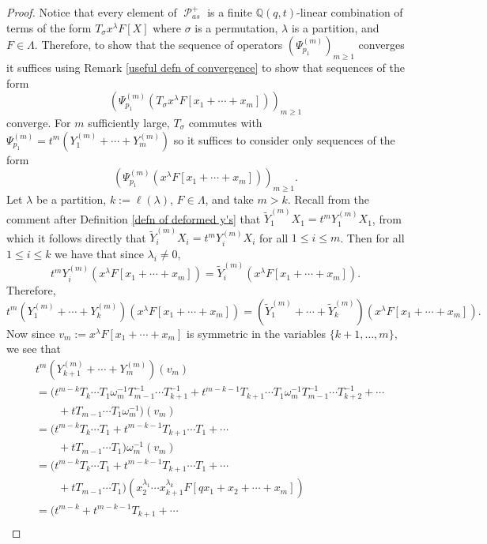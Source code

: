 \documentclass[11pt]{article}
\theoremstyle{definition}
\numberwithin{equation}{section}
\DeclareMathOperator{\sP}{\mathscr{P} }
\begin{document}
\begin{proof}
    Notice that every element of $\sP_{as}^{+}$ is a finite $\mathbb{Q}(q,t)$-linear combination of terms of the form $T_{\sigma}x^{\lambda}F[X]$ where $\sigma$ is a permutation, $\lambda$ is a partition, and $F\in \Lambda$. Therefore, to show that the sequence of operators $(\Psi_{p_1}^{(m)})_{m\geq 1}$ converges it suffices using Remark \ref{useful defn of convergence} to show that sequences of the form 
    $$(\Psi_{p_1}^{(m)}(T_{\sigma}x^{\lambda}F[x_1+ \cdots +x_m]))_{m \geq 1} $$ converge. For $m$ sufficiently large, $T_{\sigma}$ commutes with $\Psi_{p_1}^{(m)} = t^m(Y_{1}^{(m)}+ \cdots + Y_{m}^{(m)})$ so it suffices to consider only sequences of the form $$(\Psi_{p_1}^{(m)}(x^{\lambda}F[x_1+ \cdots +x_m])) _{m \geq 1} .$$ Let $\lambda$ be a partition, $k := \ell(\lambda)$, $F\in \Lambda$, and take $m > k$. Recall from the comment after Definition \ref{defn of deformed y's} that $\widetilde{Y}_1^{(m)}X_1 = t^mY_{1}^{(m)}X_1$, from which it follows directly that $\widetilde{Y}_i^{(m)}X_i = t^mY_{i}^{(m)}X_i$ for all $1 \leq i \leq m$. Then for all $1\leq i \leq k$ we have that since $\lambda_i \neq 0$, 
    $$t^mY_i^{(m)}(x^{\lambda}F[x_1+\cdots+x_m]) = \widetilde{Y}_{i}^{(m)}(x^{\lambda}F[x_1+\cdots+x_m]).$$
    Therefore, 
    $$t^m(Y_1^{(m)}+ \cdots +Y_k^{(m)})(x^{\lambda}F[x_1+ \cdots +x_m]) = (\widetilde{Y}_{1}^{(m)}+ \cdots + \widetilde{Y}_{k}^{(m)})(x^{\lambda}F[x_1+ \cdots +x_m]).$$
    Now since $v_m:=x^{\lambda}F[x_1+\cdots+x_m]$ is symmetric in the variables $\{k+1,\ldots,m\},$ we see that     
    \begin{align*}
        &t^m(Y_{k+1}^{(m)}+ \cdots + Y_{m}^{(m)})(v_m) \\
        &= (t^{m-k}T_{k}\cdots T_1 \omega_m^{-1}T_{m-1}^{-1}\cdots T_{k+1}^{-1} + t^{m-k-1}T_{k+1}\cdots T_1 \omega^{-1}_{m}T_{m-1}^{-1}\cdots T_{k+2}^{-1} + \cdots \\
          & \qquad + tT_{m-1}\cdots T_1 \omega_{m}^{-1})(v_m) \\
        &= (t^{m-k}T_{k}\cdots T_1 + t^{m-k-1}T_{k+1}\cdots T_1 + \cdots \\
          & \qquad + tT_{m-1}\cdots T_1)\omega_m^{-1}(v_m) \\
        &= (t^{m-k}T_{k}\cdots T_1 + t^{m-k-1}T_{k+1}\cdots T_1 + \cdots \\
          & \qquad + tT_{m-1}\cdots T_1)(x_2^{\lambda_1}\cdots x_{k+1}^{\lambda_{k}}F[qx_1+x_2+ \cdots + x_m])\\
        &= (t^{m-k}+t^{m-k-1}T_{k+1}+ \cdots \\

\end{align*}
\end{proof}
\end{document}
